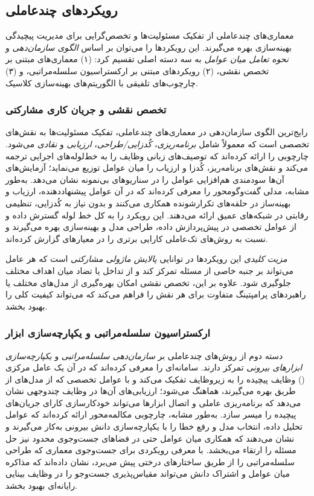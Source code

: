 \subsection{رویکردهای چندعاملی}
معماری‌های چندعاملی از تفکیک مسئولیت‌ها و تخصص‌گرایی برای مدیریت پیچیدگی بهینه‌سازی بهره می‌گیرند. این رویکردها را می‌توان بر اساس \emph{الگوی سازمان‌دهی} و \emph{نحوه تعامل میان عوامل} به سه دسته اصلی تقسیم کرد: (۱) معماری‌های مبتنی بر تخصص نقشی، (۲) رویکردهای مبتنی بر ارکستراسیون سلسله‌مراتبی، و (۳) چارچوب‌های تلفیقی با الگوریتم‌های بهینه‌سازی کلاسیک.

\subsubsection{تخصص نقشی و جریان کاری مشارکتی}
رایج‌ترین الگوی سازمان‌دهی در معماری‌های چندعاملی، تفکیک مسئولیت‌ها به نقش‌های تخصصی است که معمولاً شامل \emph{برنامه‌ریزی}، \emph{کُدزایی/طراحی}، \emph{ارزیابی} و \emph{نقادی} می‌شود. \cite{xu2024largeTextToML} چارچوبی را ارائه کرده‌اند که توصیف‌های زبانی وظایف را به خط‌لوله‌های اجرایی ترجمه می‌کند و نقش‌های برنامه‌ریز، کُدزا و ارزیاب را میان عوامل توزیع می‌نماید؛ آزمایش‌های آن‌ها سودمندی هم‌افزایی عوامل را در سناریوهای بی‌نمونه نشان می‌دهد. به‌طور مشابه، \cite{liu2025agenthpo} مدلی گفت‌وگومحور را معرفی کرده‌اند که در آن عوامل پیشنهاددهنده، ارزیاب و بهینه‌ساز در حلقه‌های تکرارشونده همکاری می‌کنند و بدون نیاز به کُدزایی، تنظیمی رقابتی در شبکه‌های عمیق ارائه می‌دهند. \cite{trirat2025automlagent} این رویکرد را به کل خط لوله  گسترش داده و از عوامل تخصصی در پیش‌پردازش داده، طراحی مدل و بهینه‌سازی بهره می‌گیرند و نسبت به روش‌های تک‌عاملی کارایی برتری را در معیارهای  گزارش کرده‌اند.

\emph{مزیت کلیدی} این رویکردها در توانایی \emph{پالایش ماژولی مشارکتی} است که هر عامل می‌تواند بر جنبه خاصی از مسئله تمرکز کند و از تداخل یا تضاد میان اهداف مختلف جلوگیری شود. علاوه بر این، تخصص نقشی امکان بهره‌گیری از مدل‌های مختلف یا راهبردهای پرامپتینگ متفاوت برای هر نقش را فراهم می‌کند که می‌تواند کیفیت کلی را بهبود بخشد.

\subsubsection{ارکستراسیون سلسله‌مراتبی و یکپارچه‌سازی ابزار}
دسته دوم از روش‌های چندعاملی بر \emph{سازمان‌دهی سلسله‌مراتبی} و \emph{یکپارچه‌سازی ابزارهای بیرونی} تمرکز دارند. \cite{shen2023HuggingGPT} سامانه‌ای را معرفی کرده‌اند که در آن یک عامل مرکزی () وظایف پیچیده را به زیروظایف تفکیک می‌کند و با عوامل تخصصی که از مدل‌های  از طریق  بهره می‌گیرند، هماهنگ می‌شود؛ ارزیابی‌های آن‌ها در وظایف چندوجهی نشان می‌دهد که برنامه‌ریزی عاملی و اتصال ابزارها می‌تواند خودکارسازی کارای جریان‌های پیچیده را میسر سازد. به‌طور مشابه، \cite{zhang-etal-2024-MLCopilot} چارچوبی مکالمه‌محور ارائه کرده‌اند که عوامل تحلیل داده، انتخاب مدل و رفع خطا را با یکپارچه‌سازی دانش بیرونی به‌کار می‌گیرند و نشان می‌دهند که همکاری میان عوامل حتی در فضاهای جست‌وجوی محدود نیز حل مسئله را ارتقاء می‌بخشد. \cite{Yang2025NADER} با معرفی رویکردی برای جست‌وجوی معماری که طراحی سلسله‌مراتبی را از طریق ساختارهای درختی پیش می‌برد، نشان داده‌اند که مذاکره میان عوامل و اشتراک دانش می‌تواند مقیاس‌پذیری جست‌وجو را در وظایف بینایی رایانه‌ای بهبود بخشد.

